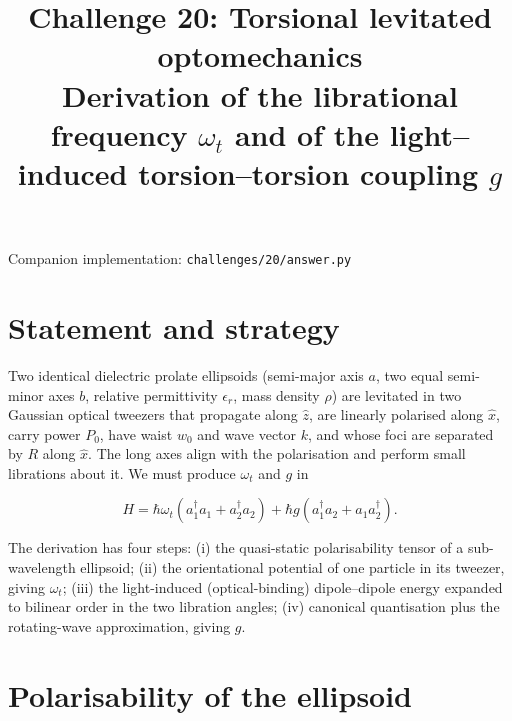 \documentclass[11pt,a4paper]{article}
\title{\bfseries Challenge 20: Torsional levitated optomechanics\\[2pt]
\large Derivation of the librational frequency $\omega_t$ and of the
light--induced torsion--torsion coupling $g$}
\author{}
\date{}
\begin{document}
\maketitle
\vspace{-2.2\baselineskip}

\begin{center}
\small
Companion implementation: \texttt{challenges/20/answer.py}
\end{center}

\section{Statement and strategy}

Two identical dielectric prolate ellipsoids (semi-major axis $a$, two equal
semi-minor axes $b$, relative permittivity $\epsilon_r$, mass density $\rho$) are
levitated in two Gaussian optical tweezers that propagate along $\hat z$, are
linearly polarised along $\hat x$, carry power $P_0$, have waist $w_0$ and wave
vector $k$, and whose foci are separated by $R$ along $\hat x$.  The long axes
align with the polarisation and perform small librations about it.  We must
produce $\omega_t$ and $g$ in

\begin{equation}
  H=\hbar\omega_t\left(a_1^{\dagger}a_1+a_2^{\dagger}a_2\right)
   +\hbar g\left(a_1^{\dagger}a_2+a_1a_2^{\dagger}\right).
  \label{eq:H}
\end{equation}

The derivation has four steps: (i) the quasi-static polarisability tensor of a
sub-wavelength ellipsoid; (ii) the orientational potential of one particle in its
tweezer, giving $\omega_t$; (iii) the light-induced (optical-binding)
dipole--dipole energy expanded to bilinear order in the two libration angles;
(iv) canonical quantisation plus the rotating-wave approximation, giving $g$.

\section{Polarisability of the ellipsoid}
\end{document}
